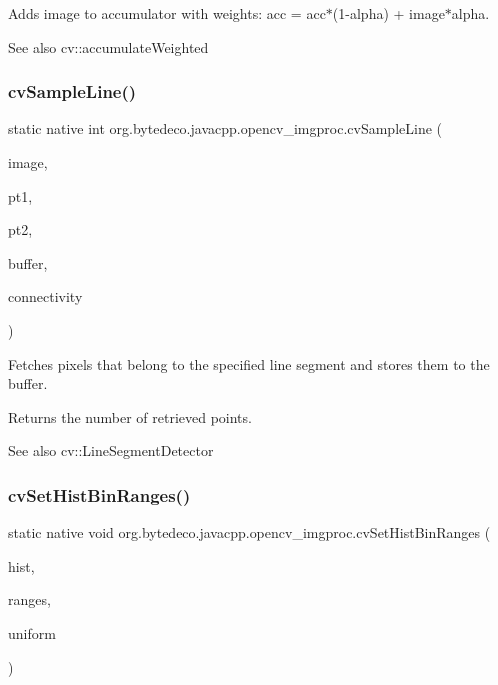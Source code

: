 Adds image to accumulator with weights\+: acc = acc$\ast$(1-\/alpha) + image$\ast$alpha. 

\begin{DoxySeeAlso}{See also}
cv\+::accumulate\+Weighted 
\end{DoxySeeAlso}
\mbox{\label{group__imgproc__c_gaea92829f3b2b25c80d12aa39d189fd70}} 
\subsubsection{\texorpdfstring{cv\+Sample\+Line()}{cvSampleLine()}}
{\footnotesize\ttfamily static native int org.\+bytedeco.\+javacpp.\+opencv\+\_\+imgproc.\+cv\+Sample\+Line (\begin{DoxyParamCaption}\item[{@Const Cv\+Arr}]{image,  }\item[{@By\+Val Cv\+Point}]{pt1,  }\item[{@By\+Val Cv\+Point}]{pt2,  }\item[{Pointer}]{buffer,  }\item[{int}]{connectivity }\end{DoxyParamCaption})\hspace{0.3cm}{\ttfamily [static]}}



Fetches pixels that belong to the specified line segment and stores them to the buffer. 

Returns the number of retrieved points. \begin{DoxySeeAlso}{See also}
cv\+::\+Line\+Segment\+Detector 
\end{DoxySeeAlso}
\mbox{\label{group__imgproc__c_ga0e759a50b0655297cb3cb3215bdb0f5b}} 
\subsubsection{\texorpdfstring{cv\+Set\+Hist\+Bin\+Ranges()}{cvSetHistBinRanges()}}
{\footnotesize\ttfamily static native void org.\+bytedeco.\+javacpp.\+opencv\+\_\+imgproc.\+cv\+Set\+Hist\+Bin\+Ranges (\begin{DoxyParamCaption}\item[{Cv\+Histogram}]{hist,  }\item[{@Cast(\char`\"{}float$\ast$$\ast$\char`\"{}) Pointer\+Pointer}]{ranges,  }\item[{int}]{uniform }\end{DoxyParamCaption})\hspace{0.3cm}{\ttfamily [static]}}



